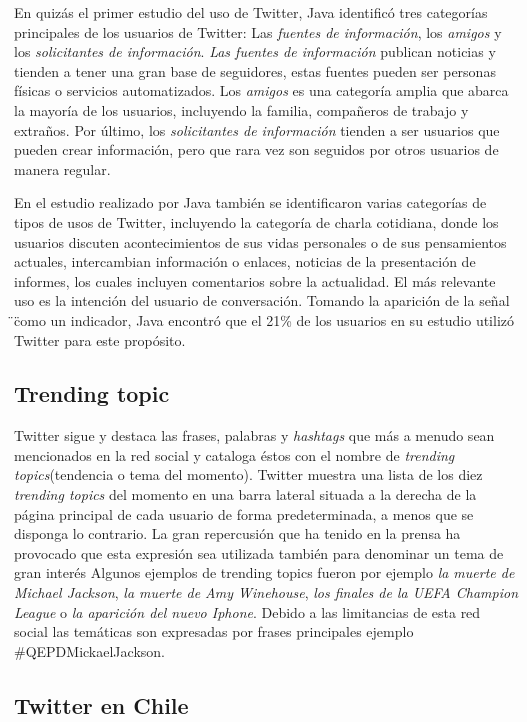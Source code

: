 En quizás el primer estudio del uso de Twitter, Java \cite{JavaEtAl:07} identificó tres categorías principales de los usuarios de Twitter: Las \emph{fuentes de información}, los \emph{amigos} y los \emph{solicitantes de información}.
\emph{Las fuentes de información} publican noticias y tienden a tener una gran base de seguidores, estas fuentes pueden ser personas físicas o servicios automatizados. Los \emph{amigos} es una categoría amplia que abarca la mayoría de los usuarios, incluyendo la familia, compañeros de trabajo y extraños. Por último, los \emph{solicitantes de información} tienden a ser usuarios que pueden crear información, pero que rara vez son seguidos por otros usuarios de manera regular.

En el estudio realizado por Java \cite{JavaEtAl:07} también se identificaron varias categorías de tipos de usos de Twitter, incluyendo la categoría de charla cotidiana, donde los usuarios discuten acontecimientos de sus vidas personales o de sus pensamientos actuales, intercambian información o enlaces, noticias de la presentación de informes, los cuales incluyen comentarios sobre la actualidad. El  más relevante uso es la intención del usuario de conversación. Tomando la aparición de la señal \"\@\" como un indicador, Java encontró que el 21\% de los usuarios en su estudio utilizó Twitter para este propósito.

\subsection{Trending topic}

Twitter sigue y destaca las frases, palabras y \emph{hashtags} que más a menudo sean mencionados en la red social y cataloga éstos con el nombre de \emph{trending topics}(tendencia o tema del momento).
Twitter muestra una lista de los diez \emph{trending topics} del momento en una barra lateral situada a la derecha de la página principal de cada usuario de forma predeterminada, a menos que se disponga lo contrario. La gran repercusión que ha tenido en la prensa ha provocado que esta expresión sea utilizada también para denominar un tema de gran interés Algunos ejemplos de trending topics fueron por ejemplo \emph{la muerte de Michael Jackson}, \emph{la muerte de Amy Winehouse}, \emph{los finales de la UEFA Champion League} o \emph{la aparición del nuevo Iphone}. Debido a las limitancias de esta red social las temáticas son expresadas por frases principales ejemplo \#QEPDMickaelJackson.

\subsection{Twitter en Chile}

